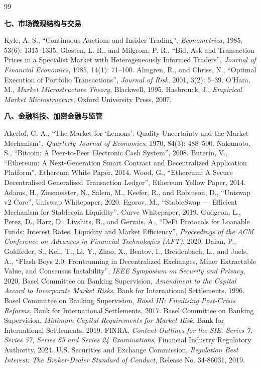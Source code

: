 \begin{thebibliography}{99}
\item[] \textbf{七、市场微观结构与交易}

 Kyle, A. S., ``Continuous Auctions and Insider Trading'', \emph{Econometrica}, 1985, 53(6): 1315--1335.
 Glosten, L. R., and Milgrom, P. R., ``Bid, Ask and Transaction Prices in a Specialist Market with Heterogeneously Informed Traders'', \emph{Journal of Financial Economics}, 1985, 14(1): 71--100.
 Almgren, R., and Chriss, N., ``Optimal Execution of Portfolio Transactions'', \emph{Journal of Risk}, 2001, 3(2): 5--39.
 O'Hara, M., \emph{Market Microstructure Theory}, Blackwell, 1995.
 Hasbrouck, J., \emph{Empirical Market Microstructure}, Oxford University Press, 2007.

\item[] \textbf{八、金融科技、加密金融与监管}

 Akerlof, G. A., ``The Market for `Lemons': Quality Uncertainty and the Market Mechanism'', \emph{Quarterly Journal of Economics}, 1970, 84(3): 488--500.
 Nakamoto, S., ``Bitcoin: A Peer-to-Peer Electronic Cash System'', 2008.
 Buterin, V., ``Ethereum: A Next-Generation Smart Contract and Decentralized Application Platform'', Ethereum White Paper, 2014.
 Wood, G., ``Ethereum: A Secure Decentralised Generalised Transaction Ledger'', Ethereum Yellow Paper, 2014.
 Adams, H., Zinsmeister, N., Salem, M., Keefer, R., and Robinson, D., ``Uniswap v2 Core'', Uniswap Whitepaper, 2020.
 Egorov, M., ``StableSwap --- Efficient Mechanism for Stablecoin Liquidity'', Curve Whitepaper, 2019.
 Gudgeon, L., Perez, D., Harz, D., Livshits, B., and Gervais, A., ``DeFi Protocols for Loanable Funds: Interest Rates, Liquidity and Market Efficiency'', \emph{Proceedings of the ACM Conference on Advances in Financial Technologies (AFT)}, 2020.
 Daian, P., Goldfeder, S., Kell, T., Li, Y., Zhao, X., Bentov, I., Breidenbach, L., and Juels, A., ``Flash Boys 2.0: Frontrunning in Decentralized Exchanges, Miner Extractable Value, and Consensus Instability'', \emph{IEEE Symposium on Security and Privacy}, 2020.
 Basel Committee on Banking Supervision, \emph{Amendment to the Capital Accord to Incorporate Market Risks}, Bank for International Settlements, 1996.
 Basel Committee on Banking Supervision, \emph{Basel III: Finalising Post-Crisis Reforms}, Bank for International Settlements, 2017.
 Basel Committee on Banking Supervision, \emph{Minimum Capital Requirements for Market Risk}, Bank for International Settlements, 2019.
 FINRA, \emph{Content Outlines for the SIE, Series 7, Series 57, Series 65 and Series 24 Examinations}, Financial Industry Regulatory Authority, 2024.
 U.S. Securities and Exchange Commission, \emph{Regulation Best Interest: The Broker-Dealer Standard of Conduct}, Release No. 34-86031, 2019.

\end{thebibliography}
